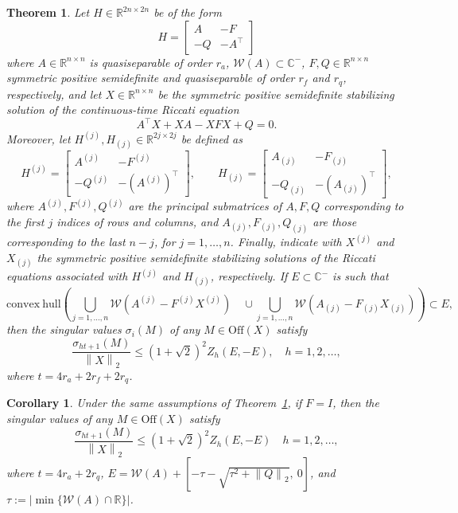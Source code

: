 \documentclass[10pt,a4paper]{amsart}
\newtheorem{theorem}{Theorem}
\newtheorem{corollary}{Corollary}
\newcommand{\norm}[1]{\left\lVert#1\right\rVert}
\begin{document}
\begin{theorem}\label{thm:sing-decay}
	Let $H\in\mathbb R^{2n\times 2n}$ be of the form
	$$
	H=\begin{bmatrix}
		A&-F\\
		-Q&-A^\top
	\end{bmatrix}
	$$
	where $A\in\mathbb R^{n\times n}$ is  quasiseparable of order $r_a$, $\mathcal W(A)\subset\mathbb C^{-}$, $F,Q\in\mathbb R^{n\times n}$ symmetric positive semidefinite  and quasiseparable of order $r_f$ and $r_q$, respectively, and let $X\in\mathbb R^{n\times n}$ be the symmetric positive semidefinite stabilizing solution of the continuous-time Riccati equation 
	$$
	A^\top X+XA-XFX+Q=0.
	$$
	Moreover, let $H^{(j)},H_{(j)}\in\mathbb R^{2j\times 2j}$ be defined as
	$$
	H^{(j)}=\begin{bmatrix}
		A^{(j)}&-F^{(j)}\\
		-Q^{(j)}&-(A^{(j)})^\top
	\end{bmatrix},\qquad H_{(j)}=\begin{bmatrix}
		A_{(j)}&-F_{(j)}\\
		-Q_{(j)}&-(A_{(j)})^\top
	\end{bmatrix},
	$$
	where $A^{(j)},F^{(j)},Q^{(j)}$  are the principal submatrices of $A,F,Q$ corresponding to the first $j$ indices of rows and columns, and $A_{(j)},F_{(j)},Q_{(j)}$ are those corresponding to the last $n-j$, for $j=1,\dots, n$. Finally, indicate with $X^{(j)}$ and $X_{(j)}$ the symmetric positive semidefinite stabilizing solutions of the Riccati equations associated with $H^{(j)}$ and $H_{(j)}$, respectively. 
	If $E\subset \mathbb C^-$ is such that
	$$
	\mathrm{convex\ hull}\left(\bigcup_{j=1,\dots, n}\mathcal W(A^{(j)} - F^{(j)}X^{(j)}) \quad \cup  \bigcup_{j=1,\dots,n}\mathcal W(A_{(j)} - F_{(j)}X_{(j)})\right)\subset E,
	$$
	then the singular values $\sigma_i(M)$ of any $M\in\mathrm{Off}(X)$ satisfy
	$$
	\frac{\sigma_{ht+1}(M)}{\norm{X}_2}\le (1+\sqrt 2)^2 Z_h(E,-E), \quad h=1,2,\dots, 
	$$
	where $t=4r_a+2r_f+2r_q$.
\end{theorem}

\begin{corollary}\label{cor:sing-decay2}
	Under the same assumptions of Theorem~\ref{thm:sing-decay}, if $F=I$, then the singular values of any $M\in\mathrm{Off}(X)$ satisfy
	$$
	\frac{\sigma_{ht+1}(M)}{\norm{X}_2}\le (1+\sqrt{2})^2
	Z_h(E,-E)
	\quad h=1,2,\dots,
	$$
	where $t=4r_a+2r_q$, $E=\mathcal W(A) + \left[-\tau -\sqrt{\tau^2+\norm{Q}_2},\ 0\right]$, and $\tau:= |\min\{\mathcal W(A)\cap \mathbb R\}|$.
\end{corollary}
\end{document}
